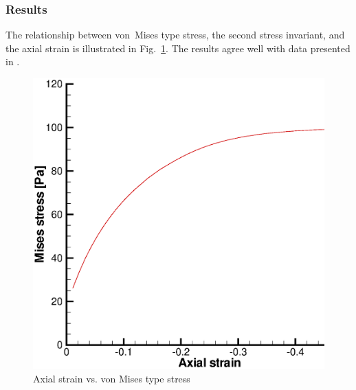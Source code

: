 \begin{minipage}{0.395\textwidth}
\subsubsection{Results}
\label{subsubsec:Mp3_res}

The relationship between von~Mises type stress, the second stress invariant, and the axial strain is illustrated in Fig.~\ref{Mp_fig:m_cc_s_r}. The results agree well with data presented in \cite{SheSloYu00}.
\end{minipage}
\hspace*{0.1\textwidth}
\begin{minipage}{0.49\textwidth}
\begin{figure}[H]
  \begin{center}
    \includegraphics[scale=0.3]{PART_II/M/cc_s_s_e.eps}
  \end{center}
  \caption{Axial strain vs. von Mises type stress }
  \label{Mp_fig:m_cc_s_r}
\end{figure}
\end{minipage}


